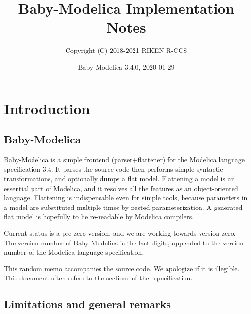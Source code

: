 \documentclass[10pt,b5paper]{article}
\title{\bf{}Baby-Modelica Implementation Notes}
\author{Copyright (C) 2018-2021 RIKEN R-CCS}
\date{Baby-Modelica 3.4.0, 2020-01-29}
\begin{document}
\maketitle

\tableofcontents



\section{Introduction}


\subsection{Baby-Modelica}

Baby-Modelica is a simple frontend (parser+flattener) for the Modelica
language specification 3.4.  It parses the source code then performs
simple syntactic transformations, and optionally dumps a flat model.
Flattening a model is an essential part of Modelica, and it resolves
all the features as an object-oriented language.  Flattening is
indispensable even for simple tools, because parameters in a model are
substituted multiple times by nested parameterization.  A generated
flat model is hopefully to be re-readable by Modelica compilers.

Current status is a pre-zero version, and we are working towards
version zero.  The version number of Baby-Modelica is the last digits,
appended to the version number of the Modelica language specification.

This random memo accompanies the source code.  We apologize if it is
illegible.  This document often refers to the sections of
the_specification.


\subsection{Limitations and general remarks}
\end{document}
